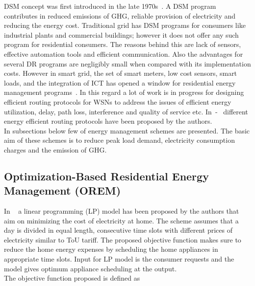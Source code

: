 \documentclass[journal]{IEEEtran}
\begin{document}
\indent DSM concept was first introduced in the late 1970s~\cite{costanzo2012system}. A DSM program contributes in reduced emissions of GHG, reliable provision of electricity and reducing the energy cost. Traditional grid has DSM programs for consumers like industrial plants and commercial buildings; however it does not offer any such program for residential consumers. The reasons behind this are  lack of sensors, effective automation tools and efficient communication. Also the advantages for several DR programs are negligibly small when compared with its implementation costs. However in smart grid, the set of smart meters, low cost sensors, smart loads, and the integration of ICT has opened a window for residential energy management programs~\cite{erol2011wireless}. In this regard a lot of work is in progress for designing efficient routing protocols for WSNs to address the issues of efficient energy utilization, delay, path loss, interference and quality of service etc. In~\cite{ahmad2013density}-~\cite{aslam2012ceec} different energy efficient routing protocols have been proposed by the authors.\\
\indent In subsections below few of energy management schemes are presented. The basic aim of these schemes is to reduce peak load demand, electricity consumption charges and the emission of GHG.

\subsection{Optimization-Based Residential Energy Management (OREM)}
In ~\cite{erol2011wireless} a linear programming (LP) model has been proposed by the authors that aim on minimizing the cost of electricity at home. The scheme assumes that a day is divided in equal length, consecutive time slots with different prices of electricity similar to ToU tariff. The proposed objective function makes sure to reduce the home energy expenses by scheduling the home appliances in appropriate time slots. Input for LP model is the consumer requests and the model gives optimum appliance scheduling at the output.\\
\indent The objective function proposed is defined as~\cite{erol2011wireless}\\
\end{document}
